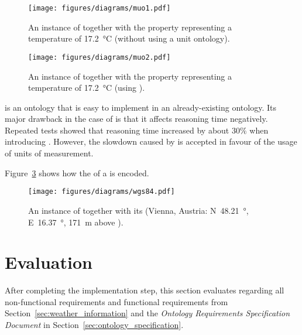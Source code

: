 \begin{figure}
  \centering
  \texttt{[image: figures/diagrams/muo1.pdf]}
  \caption[An instance of  without units]{An instance of  together with the property  representing a temperature of \SI{17.2}{\celsius} (without using a unit ontology).}
  \label{fig:muo1}
\end{figure}

\begin{figure}
  \centering
  \texttt{[image: figures/diagrams/muo2.pdf]}
  \caption[An instance of  using \muo]{An instance of  together with the property  representing a temperature of \SI{17.2}{\celsius} (using \muo).}
  \label{fig:muo2}
\end{figure}

\muo is an ontology that is easy to implement in an already-existing ontology. Its major drawback in the case of \smarthomeweather is that it affects reasoning time negatively. Repeated tests showed that reasoning time increased by about $30 \%$ when introducing \muo. However, the slowdown caused by \muo is accepted in favour of the usage of units of measurement.

\vspace{1em}

Figure~\ref{fig:owl_wgs84} shows how the  of a  is encoded. %

\begin{figure}
  \centering
  \texttt{[image: figures/diagrams/wgs84.pdf]}
  \caption[An instance of  together with its ]{An instance of  together with its  (Vienna, Austria: N~\SI{48.21}{\degree}, E~\SI{16.37}{\degree}, \SI{171}{\metre} above ).}
  \label{fig:owl_wgs84}
\end{figure}

\section{Evaluation}
\label{sec:ontology_evaluation}

After completing the implementation step, this section evaluates \smarthomeweather regarding all non-functional requirements and functional requirements from Section~\ref{sec:weather_information} and the \emph{Ontology Requirements Specification Document} in Section~\ref{sec:ontology_specification}.

